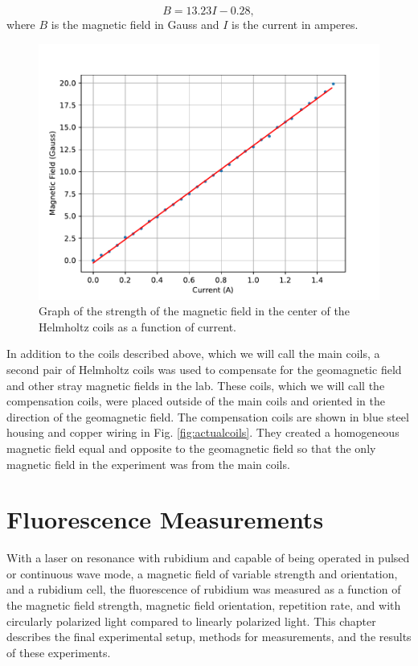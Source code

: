 \begin{equation}
	B = 13.23 I-0.28,
	\label{eq:fieldvcurrent}
\end{equation}
%
where $B$ is the magnetic field in Gauss and $I$ is the current in amperes.

\begin{figure}[h]
		\centering
		\includegraphics[width = .8\textwidth]{Images/FieldvCurrent.pdf}
		\caption{Graph of the strength of the magnetic field in the center of the Helmholtz coils as a function of current.}
		\label{fig:FieldvCurrent}
\end{figure}

In addition to the coils described above, which we will call the main coils, a second pair of Helmholtz coils was used to compensate for the geomagnetic field and other stray magnetic fields in the lab. These coils, which we will call the compensation coils, were placed outside of the main coils and oriented in the direction of the geomagnetic field. The compensation coils are shown in blue steel housing and copper wiring in Fig. \ref{fig:actualcoils}. They created a homogeneous magnetic field equal and opposite to the geomagnetic field so that the only magnetic field in the experiment was from the main coils.



\chapter{Fluorescence Measurements}
With a laser on resonance with rubidium and capable of being operated in pulsed or continuous wave mode, a magnetic field of variable strength and orientation, and a rubidium cell, the fluorescence of rubidium was measured as a function of the magnetic field strength, magnetic field orientation, repetition rate, and with circularly polarized light compared to linearly polarized light. This chapter describes the final experimental setup, methods for measurements, and the results of these experiments.

